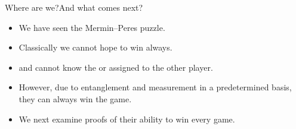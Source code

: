 \begin{frame}{Where are we?}{And what comes next?}

\begin{itemize}
    \item We have seen the Mermin--Peres puzzle.
    \item Classically we cannot hope to win always.
    \item \Alice{} and \Bob{} cannot know the  or  assigned to the other player.
    \item However, due to entanglement and measurement in a predetermined basis, they can always win the game.
    \item We next examine proofs of their ability to win every game.
\end{itemize}
    
\end{frame}
